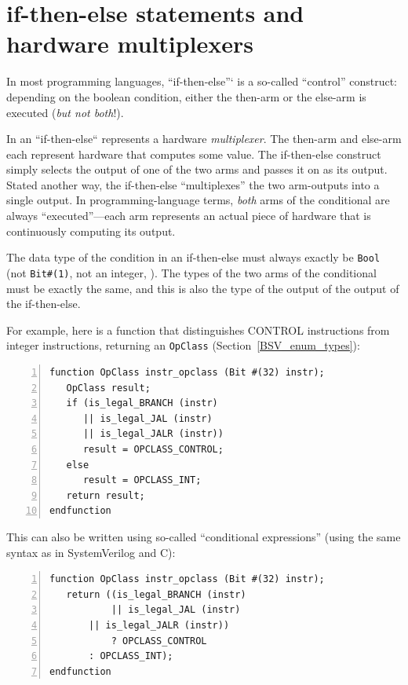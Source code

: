 
\section{if-then-else statements and hardware multiplexers}

\label{BSV_Combo_Circuits_if_then_else}


In most programming languages, ``if-then-else''` is a so-called
``control'' construct: depending on the boolean condition, either the
then-arm or the else-arm is executed (\emph{but not both}!).

In {\BSV} an ``if-then-else`` represents a hardware \emph{multiplexer}.
The then-arm and else-arm each represent hardware that computes some
value.  The if-then-else construct simply selects the output of one of
the two arms and passes it on as its output.  Stated another way, the
if-then-else ``multiplexes'' the two arm-outputs into a single output.
In programming-language terms, \emph{both} arms of the conditional are
always ``executed''---each arm represents an actual piece of hardware
that is continuously computing its output.

The data type of the condition in an if-then-else must always exactly
be \verb|Bool| (not \verb|Bit#(1)|, not an integer, {\etc}).  The
types of the two arms of the conditional must be exactly the same, and
this is also the type of the output of the output of the if-then-else.

For example, here is a function that distinguishes CONTROL
instructions from integer instructions, returning an \verb|OpClass|
(Section~\ref{BSV_enum_types}):

{\footnotesize
\begin{Verbatim}[frame=single, numbers=left]
function OpClass instr_opclass (Bit #(32) instr);
   OpClass result;
   if (is_legal_BRANCH (instr)
      || is_legal_JAL (instr)
      || is_legal_JALR (instr))
      result = OPCLASS_CONTROL;
   else
      result = OPCLASS_INT;
   return result;
endfunction
\end{Verbatim}
}

This can also be written using so-called ``conditional expressions''
(using the same syntax as in SystemVerilog and C):

{\footnotesize
\begin{Verbatim}[frame=single, numbers=left]
function OpClass instr_opclass (Bit #(32) instr);
   return ((is_legal_BRANCH (instr)
           || is_legal_JAL (instr)
	   || is_legal_JALR (instr))
           ? OPCLASS_CONTROL
	   : OPCLASS_INT);
endfunction
\end{Verbatim}
}

